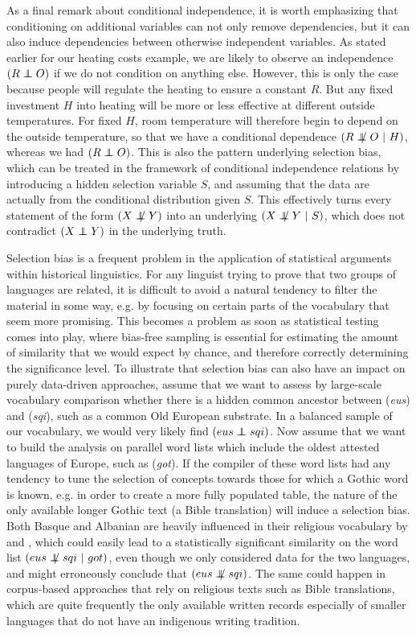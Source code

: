 As a final remark about conditional independence, it is worth emphasizing that conditioning on additional variables can not only remove dependencies, but it can also induce dependencies between otherwise independent variables. As stated earlier for our heating costs example, we are likely to observe an independence $(R \independent O)$ if we do not condition on anything else. However, this is only the case because people will regulate the heating to ensure a constant $R$. But any fixed investment $H$ into heating will be more or less effective at different outside temperatures. For fixed $H$, room temperature will therefore begin to depend on the outside temperature, so that we have a conditional dependence $(R \notindep O\ |\ H)$, whereas we had $(R \independent O)$. This is also the pattern underlying selection bias, which can be treated in the framework of conditional independence relations by introducing a hidden selection variable $S$, and assuming that the data are actually from the conditional 
distribution given $S$. This effectively turns every statement of the form $(X \notindep Y)$ into an underlying $(X \notindep Y\ |\ S)$, which does not contradict $(X \independent Y)$ in the underlying truth. 

Selection bias is a frequent problem in the application of statistical arguments within historical linguistics. For any linguist trying to prove that two groups of languages are related, it is difficult to avoid a natural tendency to filter the material in some way, e.g. by focusing on certain parts of the vocabulary that seem more promising. This becomes a problem as soon as statistical testing comes into play, where bias-free sampling is essential for estimating the amount of similarity that we would expect by chance, and therefore correctly determining the significance level. To illustrate that selection bias can also have an impact on purely data-driven approaches, assume that we want to assess by large-scale vocabulary comparison whether there is a hidden common ancestor between  (\textit{eus}) and  (\textit{sqi}), such as a common Old European substrate. In a balanced sample of our vocabulary, we would very likely find $(eus \independent sqi)$. Now assume that we want to build the analysis on parallel word lists which include the oldest attested languages of Europe, such as  (\textit{got}). If the compiler of these word lists had any tendency to tune the selection of concepts towards those for which a Gothic word is known, e.g. in order to create a more fully populated table, the nature of the only available longer Gothic text (a Bible translation) will induce a selection bias. Both Basque and Albanian are heavily influenced in their religious vocabulary by  and , which could easily lead to a statistically significant similarity on the word list $(eus \notindep sqi\ |\ got)$, even though we only considered data for the two languages, and might erroneously conclude that $(eus \notindep sqi)$. The same could happen in corpus-based approaches that rely on religious texts such as Bible translations, which are quite frequently the only available written records especially of smaller languages that do not have an indigenous writing tradition.

